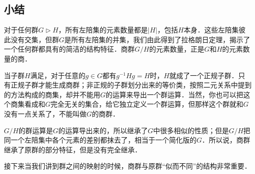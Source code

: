 \subsection{小结}

对于任何群$G\triangleright H$，所有左陪集的元素数量都是$|H|$，包括$H$本身．这些左陪集彼此没有交集，但群$G$是所有左陪集的并集，我们由此得到了拉格朗日定理，揭示了一个任何群都具有的简洁的结构特征．商群$G/H$的元素数量，正是$G$和$H$的元素数量的商．

当子群$H$满足，对于任意的$g\in G$都有$g^{-1}Hg=H$时，$H$就成了一个正规子群．只有正规子群才能生成商群；非正规的子群划分出来的等价类，按照二元关系中提到的方法构成的商集，却并不能用$G$的运算来导出一个群运算．当然，你也可以把这个商集看成和$G$完全无关的集合，给它独立定义一个群运算，但那样这个群就和$G$没有一点关系了，不能叫做$G$的商群．

$G/H$的群运算是$G$的运算导出来的，所以继承了$G$中很多相似的性质；但是$G/H$把同一个左陪集中各个元素的差别都抹去了，相当于一个简化版的$G$．所以说，商群继承了原群的部分特征，但是没有完全继承．

接下来当我们讲到群之间的映射的时候，商群与原群“似而不同”的结构非常重要．





